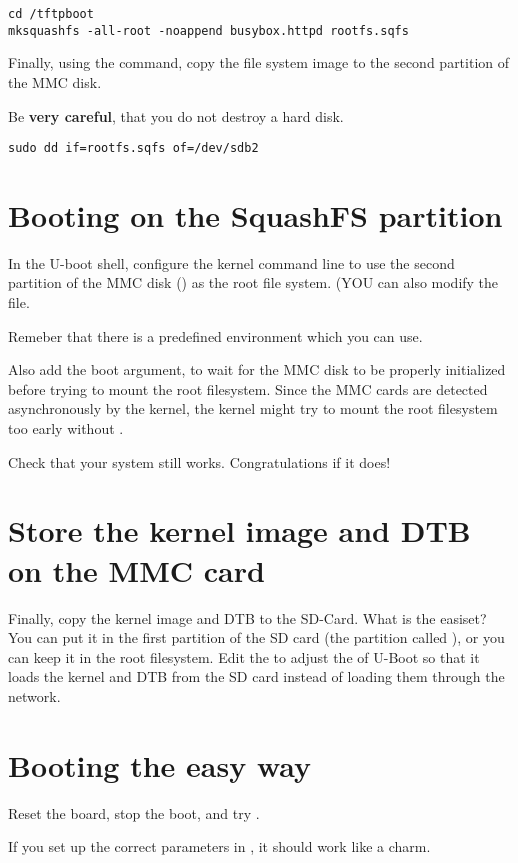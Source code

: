 \begin{verbatim}
cd /tftpboot
mksquashfs -all-root -noappend busybox.httpd rootfs.sqfs
\end{verbatim}

Finally, using the  command, copy the file system image to
the second partition of the MMC disk.

Be {\bf very careful}, that you do not destroy a hard disk.

\begin{verbatim}
sudo dd if=rootfs.sqfs of=/dev/sdb2
\end{verbatim}

\section{Booting on the SquashFS partition}

In the U-boot shell, configure the kernel command line to use the
second partition of the MMC disk () as the 
root file system. (YOU can also modify the  file.

Remeber that there is a predefined environment which you can use.

Also add the  boot argument, to wait for the MMC disk to be properly
initialized before trying to mount the root filesystem. Since the MMC
cards are detected asynchronously by the kernel, the kernel might try
to mount the root filesystem too early without .

Check that your system still works. Congratulations if it does!

\section{Store the kernel image and DTB on the MMC card}

Finally, copy the  kernel image and DTB to the SD-Card.
What is the easiset?
You can put it in the first partition of the SD card (the partition called ),
or you can keep it in the root filesystem. Edit the 
to adjust the  of U-Boot so that it loads the kernel and DTB from the 
SD card instead of loading them through the network.

\section{Booting the easy way}

Reset the board, stop the boot, and try .

If you set up the correct parameters in , it
should work like a charm.
 

